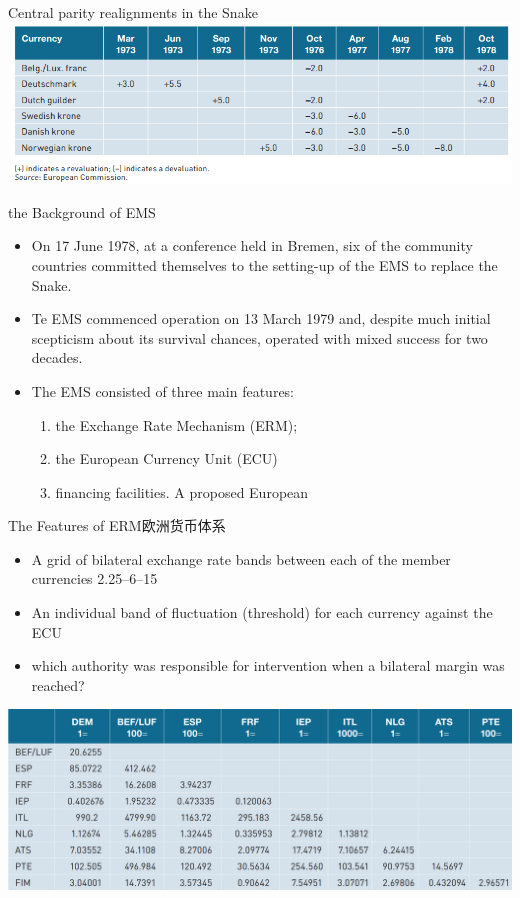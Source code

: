 \documentclass[10pt,hyperref={CJKbookmarks=true},xcolor=dvipsnames,aspectratio=169]{beamer}
\begin{document}
\begin{frame}{Central parity realignments in the Snake}
		\centering
\includegraphics[scale=0.8]{fig/euro/snake}
\end{frame}

\begin{frame}{the Background of EMS}
	\begin{itemize}
		\item On 17 June 1978, at a conference held in Bremen, six of the community countries
		committed themselves to the setting-up of the EMS to replace the Snake.
		\item Te EMS commenced operation on 13 March 1979 and, despite much initial scepticism about its survival chances, operated with mixed success for two decades. 
		\item The		EMS consisted of three main features:
		\begin{enumerate}
			\item the Exchange Rate Mechanism (ERM); 
			\item the European Currency Unit (ECU)
			\item  financing facilities. A proposed European				
			\end{enumerate} 
	\end{itemize}
\end{frame}

\begin{frame}{The Features of  ERM欧洲货币体系}
\begin{itemize}
	\item A grid of bilateral exchange rate bands between each of the member currencies
	2.25--6--15
	\item An individual band of fluctuation (threshold) for each currency against the ECU
	\item  which authority was responsible for intervention when a bilateral margin was	reached?
\end{itemize}
		\centering
\includegraphics[scale=0.35]{fig/euro/grid}
\end{frame}
\end{document}
